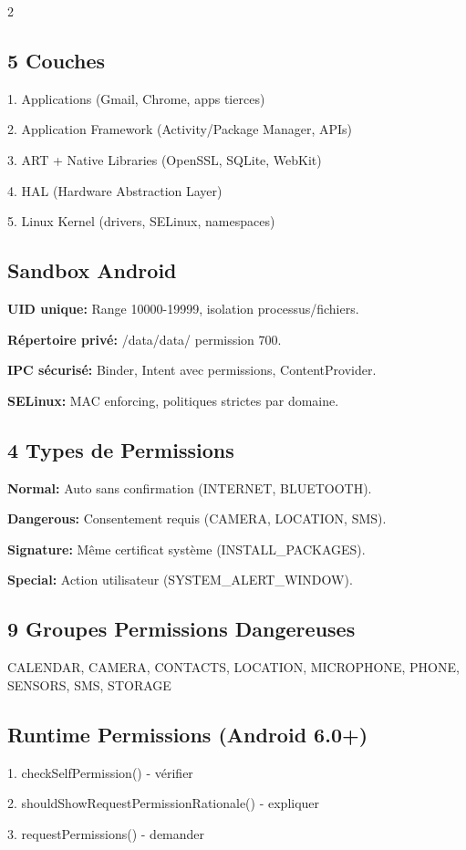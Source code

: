 \documentclass[9pt,a4paper]{extarticle}
\begin{document}
\begin{multicols}{2}
\subsection*{5 Couches}
1. Applications (Gmail, Chrome, apps tierces)

2. Application Framework (Activity/Package Manager, APIs)

3. ART + Native Libraries (OpenSSL, SQLite, WebKit)

4. HAL (Hardware Abstraction Layer)

5. Linux Kernel (drivers, SELinux, namespaces)

\subsection*{Sandbox Android}
\textbf{UID unique:} Range 10000-19999, isolation processus/fichiers.

\textbf{Répertoire privé:} /data/data/ permission 700.

\textbf{IPC sécurisé:} Binder, Intent avec permissions, ContentProvider.

\textbf{SELinux:} MAC enforcing, politiques strictes par domaine.

\subsection*{4 Types de Permissions}
\textbf{Normal:} Auto sans confirmation (INTERNET, BLUETOOTH).

\textbf{Dangerous:} Consentement requis (CAMERA, LOCATION, SMS).

\textbf{Signature:} Même certificat système (INSTALL\_PACKAGES).

\textbf{Special:} Action utilisateur (SYSTEM\_ALERT\_WINDOW).

\subsection*{9 Groupes Permissions Dangereuses}
CALENDAR, CAMERA, CONTACTS, LOCATION, MICROPHONE, PHONE, SENSORS, SMS, STORAGE

\subsection*{Runtime Permissions (Android 6.0+)}
1. checkSelfPermission() - vérifier

2. shouldShowRequestPermissionRationale() - expliquer

3. requestPermissions() - demander


\end{multicols}
\end{document}
